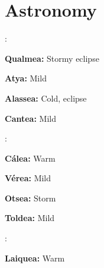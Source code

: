 
\renewcommand{\headingtype}{APPENDIX}

\appendix

\appendixpage

\addappheadtotoc

\chapter{Astronomy}\label{astronomy}\label{seasons}
\setcounter{list}{0}\setcounter{enc}{0}

\begin{multicols}{2}

\begin{tcolorbox}
\begin{list}{\addtocounter{enc}{1} \bf Cycle }{}

\item :


\begin{list}{\addtocounter{list}{1}}{}

\item \textbf{Qualmea:}  Stormy eclipse

\item \textbf{Atya:}  Mild

\item \textbf{Alassea:}  Cold, eclipse

\item \textbf{Cantea:}  Mild
\end{list}

\item :

\begin{list}{\addtocounter{list}{1}}{}
\item \textbf{C\'{a}lea:}  Warm

\item \textbf{V\'{e}rea:}  Mild

\item \textbf{Otsea:}  Storm

\item \textbf{Toldea:}  Mild

\end{list}

\item :

\begin{list}{\addtocounter{list}{1}}{}

\item \textbf{Laiquea:}  Warm


\end{list}
\end{list}
\end{tcolorbox}
\end{multicols}
